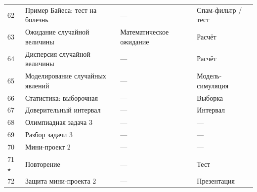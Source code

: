 \documentclass[12pt,a4paper]{article}
\newcommand{\ml}[1]{\textcolor{blue!65!black}{\small #1}}
\begin{document}
\begin{longtable}{C{0.9cm}L{4.3cm}L{4.1cm}L{4.5cm}}
62 & Пример Байеса: тест на болезнь & --- & \ml{Спам-фильтр / тест}\\
63 & Ожидание случайной величины & Математическое ожидание & \ml{Расчёт}\\
64 & Дисперсия случайной величины & --- & \ml{Расчёт}\\
65 & Моделирование случайных явлений & --- & \ml{Модель-симуляция}\\
66 & Статистика: выборочная & --- & \ml{Выборка}\\
67 & Доверительный интервал & --- & \ml{Интервал}\\
68 & Олимпиадная задача 3 & --- & ---\\
69 & Разбор задачи 3 & --- & ---\\
70 & Мини-проект 2 & --- & ---\\
71 $\star$ & Повторение & --- & Тест\\
72 & Защита мини-проекта 2 & --- & Презентация\\
\midrule


\end{longtable}
\end{document}
